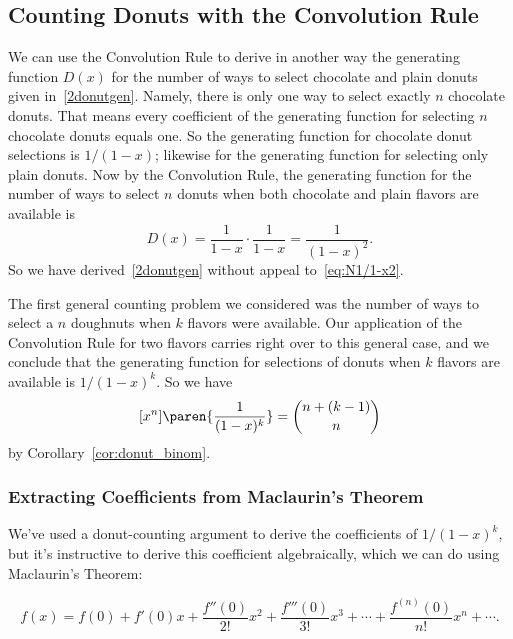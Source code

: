 \subsection{Counting Donuts with the Convolution Rule}

We can use the Convolution Rule to derive in another way the
generating function $D(x)$ for the number of ways to select chocolate
and plain donuts given in~\eqref{2donutgen}.  Namely, there is only
one way to select exactly $n$ chocolate donuts.  That means every
coefficient of the generating function for selecting $n$ chocolate
donuts equals one.  So the generating function for chocolate donut
selections is $1/(1-x)$; likewise for the generating function for
selecting only plain donuts.  Now by the Convolution Rule, the
generating function for the number of ways to select $n$ donuts when
both chocolate and plain flavors are available is
\[
D(x) = \frac{1}{1-x} \cdot \frac{1}{1-x} = \frac{1}{(1-x)^2}.
\]
So we have derived~\eqref{2donutgen} without appeal
to~\eqref{eq:N1/1-x2}.

The first general counting problem we considered was the number of
ways to select a $n$ doughnuts when $k$ flavors were available.  Our
application of the Convolution Rule for two flavors carries right over
to this general case, and we conclude that the generating function for
selections of donuts when $k$ flavors are available is $1/(1-x)^k$.
So we have
\begin{equation}\label{eq:donut_coefficient}
[x^n]\paren{\frac{1}{(1-x)^k}} = \binom{n+(k-1)}{n}
\end{equation}
by Corollary~\ref{cor:donut_binom}.

\subsubsection{Extracting Coefficients from Maclaurin's Theorem}

We've used a donut-counting argument to derive the coefficients of
$1/(1-x)^k$, but it's instructive to derive this coefficient
algebraically, which we can do using Maclaurin's Theorem:
\begin{theorem}\label{thm:maclauren}
\[
f(x) = f(0) + f'(0) x + \frac{f''(0)}{2!} x^2 + \frac{f'''(0)}{3!} x^3 + \cdots
+ \frac{f^{(n)}(0)}{n!} x^n + \cdots.
\]
\end{theorem}

